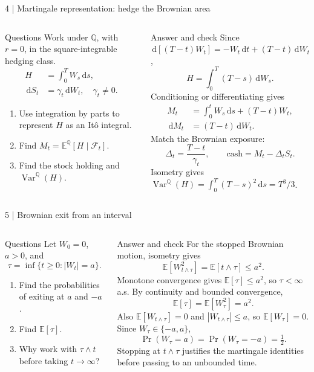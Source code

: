 \documentclass[handout,10pt,t,aspectratio=169]{beamer}
\newcommand{\E}{\mathbb E}
\newcommand{\Q}{\mathbb Q}
\newcommand{\F}{\mathcal F}
\newcommand{\dd}{\,\mathrm d}
\newcommand{\Var}{\operatorname{Var}}
\newenvironment{questions}{\begin{block}{Questions}}{\end{block}}
\newenvironment{answers}{\begin{exampleblock}{Answer and check}}{\end{exampleblock}}
\newcommand{\compact}{\small%
 \setlength{\abovedisplayskip}{3pt}%
 \setlength{\belowdisplayskip}{3pt}%
 \setlength{\abovedisplayshortskip}{2pt}%
 \setlength{\belowdisplayshortskip}{2pt}%
 \setlength{\parskip}{2pt}}
\begin{document}
\begin{frame}{4 | Martingale representation: hedge the Brownian area}
\compact
\begin{columns}[T,onlytextwidth]
\begin{questions}
Work under \(\Q\), with \(r=0\), in the square-integrable hedging class.
\[
 \begin{aligned}
 H&=\int_0^T W_s\dd s,\\
 \dd S_t&=\gamma_t\dd W_t,\quad\gamma_t\ne0.
 \end{aligned}
\]
\begin{enumerate}
\item Use integration by parts to represent \(H\) as an It\^o integral.
\item Find \(M_t=\E^\Q[H\mid\F_t]\).
\item Find the stock holding and \(\Var^\Q(H)\).
\end{enumerate}
\end{questions}
\begin{answers}
Since \(\dd[(T-t)W_t]=-W_t\dd t+(T-t)\dd W_t\),
\[
 H=\int_0^T(T-s)\dd W_s.
\]
Conditioning or differentiating gives
\[
 \begin{aligned}
 M_t&=\int_0^tW_s\dd s+(T-t)W_t,\\
 \dd M_t&=(T-t)\dd W_t.
 \end{aligned}
\]
Match the Brownian exposure:
\[
 \boxed{\Delta_t=\frac{T-t}{\gamma_t},\qquad
 \text{cash}=M_t-\Delta_tS_t.}
\]
Isometry gives \(\Var^\Q(H)=\int_0^T(T-s)^2\dd s=T^3/3\).
\end{answers}
\end{columns}
\end{frame}

\begin{frame}{5 | Brownian exit from an interval}
\compact
\begin{columns}[T,onlytextwidth]
\begin{questions}
Let \(W_0=0\), \(a>0\), and
\[
 \tau=\inf\{t\geq0:|W_t|=a\}.
\]
\begin{enumerate}
\item Find the probabilities of exiting at \(a\) and \(-a\).
\item Find \(\E[\tau]\).
\item Why work with \(\tau\wedge t\) before taking \(t\to\infty\)?
\end{enumerate}
\end{questions}
\begin{answers}
For the stopped Brownian motion, isometry gives
\[
 \E[W_{t\wedge\tau}^2]=\E[t\wedge\tau]\leq a^2.
\]
Monotone convergence gives \(\E[\tau]\leq a^2\), so \(\tau<\infty\) a.s.
By continuity and bounded convergence,
\[
 \boxed{\E[\tau]=\E[W_\tau^2]=a^2.}
\]
Also \(\E[W_{t\wedge\tau}]=0\) and \(|W_{t\wedge\tau}|\leq a\), so
\(\E[W_\tau]=0\). Since \(W_\tau\in\{-a,a\}\),
\[
 \boxed{\Pr(W_\tau=a)=\Pr(W_\tau=-a)=\tfrac12.}
\]
Stopping at \(t\wedge\tau\) justifies the martingale identities before
passing to an unbounded time.
\end{answers}
\end{columns}
\end{frame}
\end{document}
